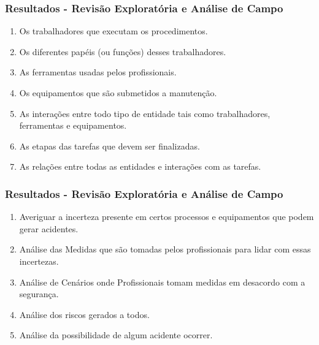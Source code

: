 \documentclass{beamer}
\begin{document}
\begin{frame}
	\frametitle{Resultados - Revisão Exploratória e Análise de Campo}
	\begin{enumerate}
		\item {Os trabalhadores que executam os procedimentos.}
		\item {Os diferentes papéis (ou funções) desses trabalhadores.}
		\item {As ferramentas usadas pelos profissionais.}
		\item {Os equipamentos que são submetidos a manutenção.}
		\item {As interações entre todo tipo de entidade tais como trabalhadores, ferramentas e equipamentos.}
		\item {As etapas das tarefas que devem ser finalizadas.}
		\item {As relações entre todas as entidades e interações com as tarefas.} 			
	\end{enumerate}
\end{frame}

\begin{frame}
	\frametitle{Resultados - Revisão Exploratória e Análise de Campo}
	\begin{enumerate}
		\item { Averiguar a incerteza presente em certos processos e equipamentos que podem gerar acidentes.}
		\item { Análise das Medidas que são tomadas pelos profissionais para lidar com essas incertezas.}
		\item { Análise de Cenários onde Profissionais tomam medidas em desacordo com a segurança.}
		\item { Análise dos riscos gerados a todos.}
		\item { Análise da possibilidade de algum acidente ocorrer.}
	\end{enumerate}
\end{frame}
\end{document}

